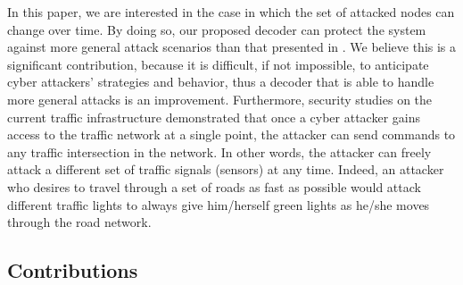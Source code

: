 \documentclass[journal]{IEEEtran}
\begin{document}
In this paper, we are interested in the case in which the set of attacked nodes can change over time. 
By doing so, our proposed decoder can protect the system against more general attack scenarios than that presented in \cite{Fawzi2014}. 
We believe this is a significant contribution, because it is difficult, if not impossible, to anticipate cyber attackers' strategies and behavior, thus a decoder that is able to handle more general attacks is an improvement. 
Furthermore, security studies on the current traffic infrastructure \cite{ghena2014traffic} demonstrated that once a cyber attacker gains access to the traffic network at a single point, the attacker can send commands to any traffic intersection in the network. In other words, the attacker can freely attack a different set of traffic signals (sensors) at any time. Indeed, an attacker who desires to travel through a set of roads as fast as possible would attack different traffic lights to always give him/herself green lights as he/she moves through the road network. 




\subsection{Contributions}
\end{document}
